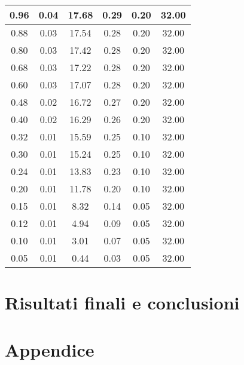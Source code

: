 \documentclass[a4paper, 11pt]{article}
\begin{document}
\begin{longtable}{|c|c|c|c|c|c|}
        0.96 & 0.04 & 17.68 & 0.29 & 0.20 & 32.00 \\
        \hline 
        0.88 & 0.03 & 17.54 & 0.28 & 0.20 & 32.00 \\
        \hline 
        0.80 & 0.03 & 17.42 & 0.28 & 0.20 & 32.00 \\
        \hline 
        0.68 & 0.03 & 17.22 & 0.28 & 0.20 & 32.00 \\
        \hline 
        0.60 & 0.03 & 17.07 & 0.28 & 0.20 & 32.00 \\
        \hline 
        0.48 & 0.02 & 16.72 & 0.27 & 0.20 & 32.00 \\
        \hline 
        0.40 & 0.02 & 16.29 & 0.26 & 0.20 & 32.00 \\
        \hline 
        0.32 & 0.01 & 15.59 & 0.25 & 0.10 & 32.00 \\
        \hline 
        0.30 & 0.01 & 15.24 & 0.25 & 0.10 & 32.00 \\
        \hline 
        0.24 & 0.01 & 13.83 & 0.23 & 0.10 & 32.00 \\
        \hline 
        0.20 & 0.01 & 11.78 & 0.20 & 0.10 & 32.00 \\
        \hline 
        0.15 & 0.01 & 8.32 & 0.14 & 0.05 & 32.00 \\
        \hline 
        0.12 & 0.01 & 4.94 & 0.09 &	0.05 & 32.00 \\
        \hline 
        0.10 & 0.01 & 3.01 & 0.07 &	0.05 & 32.00 \\
        \hline 
        0.05 & 0.01 & 0.44 & 0.03 &	0.05 & 32.00 \\
        \hline 
\end{longtable}


\section{Risultati finali e conclusioni}

\section{Appendice}
\end{document}
